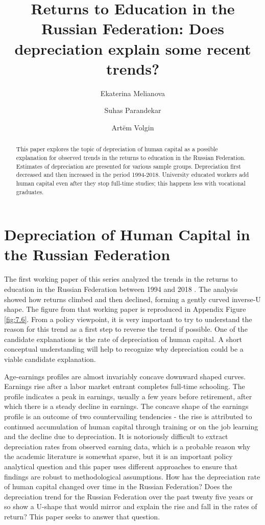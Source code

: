 \documentclass[alpha-refs]{wiley-article-02b}
\title{Returns to Education in the Russian Federation: Does depreciation explain some recent trends?}
\author[*]{Ekaterina Melianova}
\author[*]{\hspace{-1em}Suhas Parandekar}
\author[*]{\hspace{-1em}Art\"{e}m Volgin}
\affil[*]{Education Global Practice, Europe and Central Asia}
\begin{document}
	
\setcounter{page}{37} 

\maketitle

\begin{abstract}
This paper explores the topic of depreciation of human capital as a 
possible explanation for observed trends in the returns to education in the 
Russian Federation. Estimates of depreciation are presented for various 
sample groups. Depreciation first decreased and then increased in the 
period 1994-2018. University educated workers add human capital even after 
they stop full-time studies; this happens less with vocational graduates. 
\end{abstract}


\section{Depreciation of Human Capital in the Russian Federation}

The first working paper of this series analyzed the trends in the returns 
to education in the Russian Federation between 1994 and 2018 
\parencite{Patrinos_2020}. The analysis showed how returns climbed and then 
declined, forming a gently curved inverse-U shape. The figure from that 
working paper is reproduced in Appendix Figure \ref{fig:7.6}. From a policy 
viewpoint, it is very important to try to understand the reason for this 
trend as a first step to reverse the trend if possible. One of the 
candidate explanations is the rate of depreciation of human capital. A 
short conceptual understanding will help to recognize why depreciation 
could be a viable candidate explanation. 

Age-earnings profiles are almost invariably concave downward shaped curves. 
Earnings rise after a labor market entrant completes full-time schooling. 
The profile indicates a peak in earnings, usually a few years before 
retirement, after which there is a steady decline in earnings. The concave 
shape of the earnings profile is an outcome of two countervailing 
tendencies - the rise is attributed to continued accumulation of human 
capital through training or on the job learning and the decline due to 
depreciation. It is notoriously difficult to extract depreciation rates 
from observed earning data, which is a probable reason why the academic 
literature is somewhat sparse, but it is an important policy analytical 
question and this paper uses different approaches to ensure that findings 
are robust to methodological assumptions. How has the depreciation rate of 
human capital changed over time in the Russian Federation? Does the 
depreciation trend for the Russian Federation over the past twenty five 
years or so show a U-shape that would mirror and explain the rise and fall 
in the rates of return? This paper seeks to answer that question. 
\end{document}
